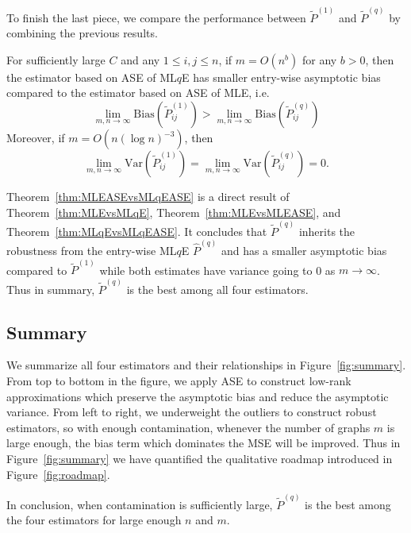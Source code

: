To finish the last piece, we compare the performance between $\widetilde{P}^{(1)}$ and $\widetilde{P}^{(q)}$ by combining the previous results.

\begin{theorem}
\label{thm:MLEASEvsMLqEASE}
For sufficiently large $C$ and any $1 \le i,j \le n$, if $m = O(n^b)$ for any $b > 0$, then the estimator based on ASE of ML$q$E has smaller entry-wise asymptotic bias compared to the estimator based on ASE of MLE, i.e.\
\[
	\lim_{m, n \to \infty} \mathrm{Bias}(\widetilde{P}_{ij}^{(1)})
    > \lim_{m, n \to \infty} \mathrm{Bias}(\widetilde{P}_{ij}^{(q)})
\]
Moreover, if $m = O(n (\log n)^{-3})$, then
\[
	\lim_{m, n \to \infty} \mathrm{Var}(\widetilde{P}_{ij}^{(1)})
    = \lim_{m, n \to \infty} \mathrm{Var}(\widetilde{P}_{ij}^{(q)}) = 0.
\]
\end{theorem}

Theorem~\ref{thm:MLEASEvsMLqEASE} is a direct result of Theorem~\ref{thm:MLEvsMLqE}, Theorem~\ref{thm:MLEvsMLEASE}, and Theorem~\ref{thm:MLqEvsMLqEASE}.
It concludes that $\widetilde{P}^{(q)}$ inherits the robustness from the entry-wise ML$q$E $\hat{P}^{(q)}$ and has a smaller asymptotic bias compared to $\widetilde{P}^{(1)}$ while both estimates have variance going to 0 as $m \to \infty$. Thus in summary, $\widetilde{P}^{(q)}$ is the best among all four estimators.

\subsection{Summary}
We summarize all four estimators and their relationships in Figure~\ref{fig:summary}.
From top to bottom in the figure, we apply ASE to construct low-rank approximations which preserve the asymptotic bias and reduce the asymptotic variance. From left to right, we underweight the outliers to construct robust estimators, so with enough contamination, whenever the number of graphs $m$ is large enough, the bias term which dominates the MSE will be improved.
Thus in Figure~\ref{fig:summary} we have quantified the qualitative roadmap introduced in Figure~\ref{fig:roadmap}.

In conclusion, when contamination is sufficiently large, $\widetilde{P}^{(q)}$ is the best among the four estimators for large enough $n$ and $m$.

